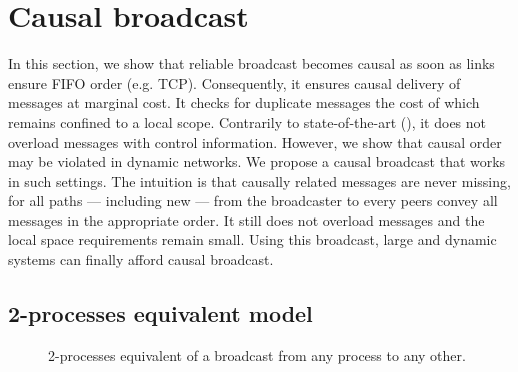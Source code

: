 
\section{Causal broadcast}
\label{sec:proposal}

In this section, we show that reliable broadcast becomes causal as soon as links
ensure FIFO order (e.g. TCP). Consequently, it ensures causal delivery of
messages at marginal cost. It checks for duplicate messages the cost of which
remains confined to a local scope. Contrarily to state-of-the-art (\REF), it
does not overload messages with control information.  However, we show that
causal order may be violated in dynamic networks. We propose a causal broadcast
that works in such settings. The intuition is that causally related messages are
never missing, for all paths --- including new --- from the broadcaster to every
peers convey all messages in the appropriate order.  It still does not overload
messages and the local space requirements remain small. Using this broadcast,
large and dynamic systems can finally afford causal broadcast.



\subsection{2-processes equivalent model}

\begin{figure}
  \begin{center}
    
    \caption{\label{fig:2eqmodel}2-processes equivalent of a broadcast from any
      process to any other.}
    \end{center}
\end{figure}

